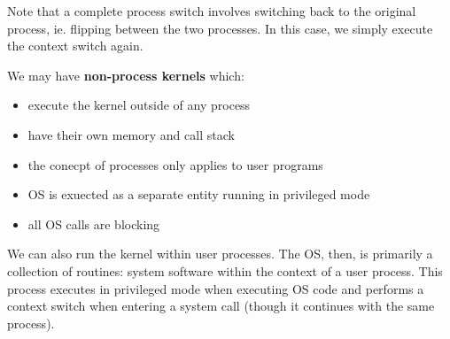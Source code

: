 \documentclass[12pt]{article}
\begin{document}
Note that a complete process switch involves switching back to the original process, ie. flipping between the two processes. In this case, we simply execute the context switch again.

We may have {\bf non-process kernels} which:
\begin{itemize}
\item execute the kernel outside of any process
\item have their own memory and call stack
\item the conecpt of processes only applies to user programs
\item OS is exuected as a separate entity running in privileged mode
\item all OS calls are blocking
\end{itemize}

We can also run the kernel within user processes. The OS, then, is primarily a collection of routines: system software within the context of a user process. This process executes in privileged mode when executing OS code and performs a context switch when entering a system call (though it continues with the same process).
\end{document}
